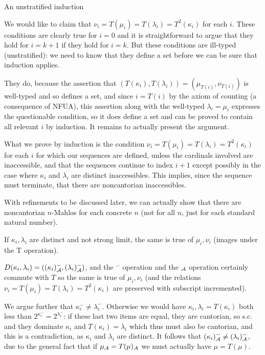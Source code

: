 \documentclass{slides}
\begin{document}
\begin{slide}

{\Large An unstratified induction}

We would like to claim that $\nu_i = T(\mu_i) = T(\lambda_i) = T^2(\kappa_i)$ for each $i$.  These conditions are clearly true for $i=0$ and it is straightforward to argue
that they hold for $i=k+1$ if they hold for $i=k$.  But these conditions are ill-typed (unstratified):  we need to know that they define a set before we can be sure that induction applies.

They do, because the assertion that $(T(\kappa_i),T(\lambda_i)) = (\mu_{T(i)},\nu_{T(i)})$ is well-typed and so defines a set, and since $i=T(i)$ by the axiom of counting (a consequence of NFUA), this assertion along with the well-typed $\lambda_i=\mu_i$ expresses the questionable condition, so it does define a set and can be proved to contain all relevant $i$ by induction.  It remains to actually present the argument.

\end{slide}

\begin{slide}

What we prove by induction is the condition $\nu_i = T(\mu_i) = T(\lambda_i) = T^2(\kappa_i)$ for each $i$ for which our sequences are defined, unless the cardinals involved are inaccessible, and that the sequences continue to index $i+1$ except possibly in the case where $\kappa_i$ and $\lambda_i$ are distinct inaccessibles.  This implies, since the sequence must terminate, that there are noncantorian inaccessibles.

With refinements to be discussed later, we can actually show that there are noncantorian $n$-Mahlos for each concrete $n$  (not for all $n$, just for each standard natural number).


\end{slide}

\begin{slide}

If $\kappa_i, \lambda_i$ are distinct and not strong limit, the same is true of $\mu_i, \nu_i$ (images under the T operation).

$D(\kappa_i,\lambda_i) = ((\kappa_i)^-_{\cal A},(\lambda_i)^-_{\cal A})$, and the $^-$ operation and the $_{\cal A}$ operation certainly commute with $T$ so the same is true of $\mu_i, \nu_i$ (and the relations $\nu_i = T(\mu_i) = T(\lambda_i) = T^2(\kappa_i)$ are preserved with subscript incremented).

We argue further that $\kappa_i^- \neq \lambda_i^-$.  Otherwise we would have $\kappa_i, \lambda_i=T(\kappa_i)$ both less than $2^{\kappa_i^-} = 2^{\lambda_i^-}$:  if these last two items are equal, they are cantorian, so s.c. and they dominate $\kappa_i$ and $T(\kappa_i)=\lambda_i$ which thus must also be cantorian, and this is a contradiction, 
as $\kappa_i$ and $\lambda_i$ are distinct.  It follows that $(\kappa_i)^- _{\cal A}\neq (\lambda_i)^-_{\cal A}$, due to the general fact that if $\mu_{\cal A} = T(\mu)_{\cal A}$ we must actually have $\mu = T(\mu)$.

\end{slide}
\end{document}
